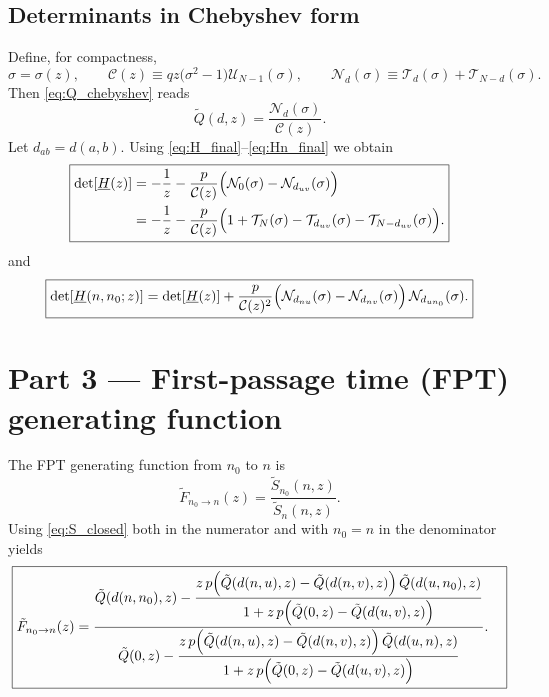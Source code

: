 \documentclass[11pt]{article}
\newcommand{\T}{\mathcal{T}}
\newcommand{\U}{\mathcal{U}}
\begin{document}
\subsection{Determinants in Chebyshev form}

Define, for compactness,
\[
\sigma=\sigma(z),\qquad
\mathcal{C}(z)\equiv qz\bigl(\sigma^2-1\bigr)\U_{N-1}(\sigma),\qquad
\mathcal{N}_d(\sigma)\equiv \T_d(\sigma)+\T_{N-d}(\sigma).
\]
Then \eqref{eq:Q_chebyshev} reads
\[
\tilde Q(d,z)=\frac{\mathcal{N}_d(\sigma)}{\mathcal{C}(z)}.
\]
Let $d_{ab}=d(a,b)$. Using \eqref{eq:H_final}--\eqref{eq:Hn_final} we obtain
\begin{equation}
\boxed{
\begin{aligned}
\det[\underline{H}(z)]
&=
-\frac{1}{z}
-\frac{p}{\mathcal{C}(z)}\Bigl(\mathcal{N}_0(\sigma)-\mathcal{N}_{d_{uv}}(\sigma)\Bigr)\\
&=
-\frac{1}{z}
-\frac{p}{\mathcal{C}(z)}\Bigl(1+\T_N(\sigma)-\T_{d_{uv}}(\sigma)-\T_{N-d_{uv}}(\sigma)\Bigr).
\end{aligned}
}
\label{eq:H_cheb}
\end{equation}
and
\begin{equation}
\boxed{
\det[\underline{H}(n,n_0;z)]
=
\det[\underline{H}(z)]
+\frac{p}{\mathcal{C}(z)^2}
\Bigl(\mathcal{N}_{d_{nu}}(\sigma)-\mathcal{N}_{d_{nv}}(\sigma)\Bigr)\,
\mathcal{N}_{d_{un_0}}(\sigma).
}
\label{eq:Hn_cheb}
\end{equation}

\section{Part 3 --- First-passage time (FPT) generating function}

The FPT generating function from $n_0$ to $n$ is
\begin{equation}
\tilde F_{n_0\to n}(z)=\frac{\tilde S_{n_0}(n,z)}{\tilde S_{n}(n,z)}.
\label{eq:F_def}
\end{equation}
Using \eqref{eq:S_closed} both in the numerator and with $n_0=n$ in the denominator yields
\begin{equation}
\boxed{
\begin{aligned}
\tilde F_{n_0\to n}(z)
&=
\frac{
\tilde Q(d(n,n_0),z)
-
\dfrac{
z\,p\Bigl(\tilde Q(d(n,u),z)-\tilde Q(d(n,v),z)\Bigr)\,\tilde Q(d(u,n_0),z)
}{
1+z\,p\Bigl(\tilde Q(0,z)-\tilde Q(d(u,v),z)\Bigr)
}
}{
\tilde Q(0,z)
-
\dfrac{
z\,p\Bigl(\tilde Q(d(n,u),z)-\tilde Q(d(n,v),z)\Bigr)\,\tilde Q(d(u,n),z)
}{
1+z\,p\Bigl(\tilde Q(0,z)-\tilde Q(d(u,v),z)\Bigr)
}
}.
\end{aligned}
}
\label{eq:F_final}
\end{equation}
\end{document}
